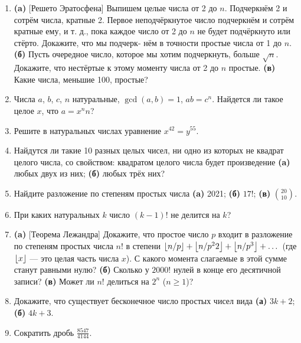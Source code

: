 \begin{enumerate}
\item \textbf{(a)} [Решето Эратосфена] Выпишем целые числа от 2 до $n$. Подчеркнём
 2 и сотрём числа, кратные 2. Первое неподчёркнутое число
подчеркнём и сотрём кратные ему, и т. д., пока каждое число от 2
до $n$ не будет подчёркнуто или стёрто. Докажите, что мы подчерк-
нём в точности простые числа от 1 до $n$. \textbf{(б)} Пусть очередное число,
которое мы хотим подчеркнуть, больше $\sqrt n$. Докажите, что нестёртые к этому моменту
 числа от 2 до $n$ простые. \textbf{(в)} Какие числа, меньшие 100, простые?

\item Числа $a$, $b$, $c$, $n$ натуральные, $\gcd(a, b) = 1$, $ab = c^n$. Найдется ли
такое целое $x$, что $a = x^nn$?

\item Решите в натуральных числах уравнение $x^{42} = y^{55}$.
\item Найдутся ли такие 10 разных целых чисел, ни одно из которых
не квадрат целого числа, со свойством: квадратом целого числа
будет произведение \textbf{(a)} любых двух из них; \textbf{(б)} любых трёх них?

\item  Найдите разложение по степеням простых числа \textbf{(a)} 2021; \textbf{(б)} $17!$; \textbf{(в)} $\binom{20}{10}$.

\item При каких натуральных $k$ число $(k - 1)!$ не делится на $k$?

\item \textbf{(a)} [Теорема Лежандра] Докажите, что простое число $p$ входит
в разложение по степеням простых числа $n!$ в степени
$\left\lfloor n/p\right\rfloor+\left\lfloor n/p^22\right\rfloor+\left\lfloor n/p^3\right\rfloor+\dots$ (где $\left\lfloor x\right\rfloor$ --- это целая часть числа $x$).
С какого момента слагаемые в этой сумме станут равными нулю?
\textbf{(б)} Сколько у $2000!$ нулей в конце его десятичной записи? \textbf{(в)} Может
ли $n!$ делиться на $2^n$ ($n \ge 1$)?

\item Докажите, что существует бесконечное число простых чисел
вида \textbf{(а)} $3k + 2$; \textbf{(б)} $4k + 3$.

\item Сократить дробь $\frac{8547}{4144}$.

\end{enumerate}

